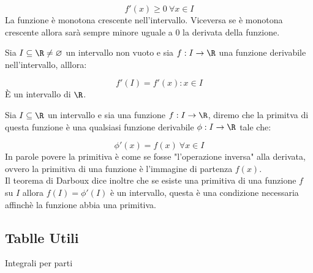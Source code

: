 \documentclass[../analisi.tex]{subfiles}
\begin{document}
\begin{equation}
	f' ( x ) \geq 0 \ \forall x \in I	
\end{equation}
La funzione è monotona crescente nell'intervallo. Viceversa se è monotona
crescente allora sarà sempre minore uguale a 0 la derivata della funzione.


\begin{defn}[Darboux]
Sia $ I \subseteq \R  \neq \varnothing $ un intervallo non vuoto e sia 
$ f: I \to \R $ una funzione derivabile nell'intervallo, alllora:

\begin{equation}
	f' ( I ) = { f' ( x ) : x\in I } 
\end{equation}
È un intervallo di $ \R $.\\
\end{defn}

\begin{defn}[Primitive]
Sia $ I \subseteq \R $ un intervallo e sia una funzione $ f: I \to \R $,
diremo che la primitva di questa funzione è una qualsiasi funzione derivabile
$ \phi : I \to \R $ tale che:

\begin{equation}
	\phi' (x) = f ( x )\ \forall x \in I
\end{equation}
In parole povere la primitiva è come se fosse "l'operazione inversa"
alla derivata, ovvero la primitiva di una funzione è l'immagine di partenza
$f ( x ) $.\\
Il teorema di Darboux dice inoltre che se esiste una primitiva di una funzione 
$ f $ su $ I $ allora $ f ( I ) = \phi ' (I) $ è un intervallo, questa 
è una condizione necessaria affinchè la funzione abbia una primitiva.
\end{defn}

\begin{defn}[]
\end{defn}

























\subsection{Tablle Utili}%
\label{sub:tablle_utili}


\clearpage



Integrali per parti
\end{document}
